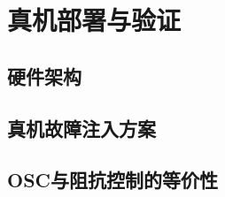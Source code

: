 
\chapter{真机部署与验证}\label{ch:real_robot}

\section{硬件架构}\label{sec:hardware}

%

\section{真机故障注入方案}\label{sec:real_fault_injection}

%
%
%
%

\section{OSC与阻抗控制的等价性}\label{sec:control_equivalence}

%
%
%

